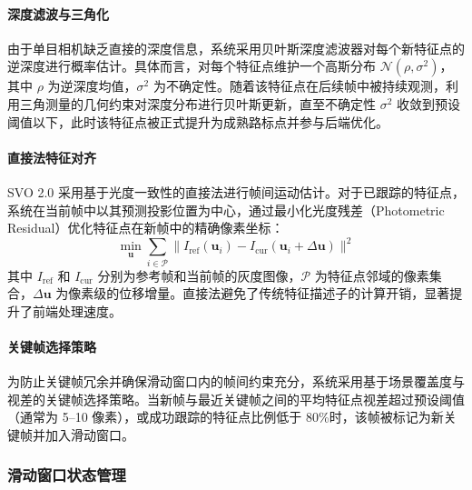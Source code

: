 \paragraph{深度滤波与三角化}
由于单目相机缺乏直接的深度信息，系统采用贝叶斯深度滤波器对每个新特征点的逆深度进行概率估计。具体而言，对每个特征点维护一个高斯分布 $\mathcal{N}(\rho, \sigma^2)$，其中 $\rho$ 为逆深度均值，$\sigma^2$ 为不确定性。随着该特征点在后续帧中被持续观测，利用三角测量的几何约束对深度分布进行贝叶斯更新，直至不确定性 $\sigma^2$ 收敛到预设阈值以下，此时该特征点被正式提升为成熟路标点并参与后端优化。

\paragraph{直接法特征对齐}
SVO 2.0 采用基于光度一致性的直接法进行帧间运动估计。对于已跟踪的特征点，系统在当前帧中以其预测投影位置为中心，通过最小化光度残差（Photometric Residual）优化特征点在新帧中的精确像素坐标：
\begin{equation}
    \min_{\mathbf{u}} \sum_{i \in \mathcal{P}} \| I_{\text{ref}}(\mathbf{u}_i) - I_{\text{cur}}(\mathbf{u}_i + \Delta \mathbf{u}) \|^2
\end{equation}
其中 $I_{\text{ref}}$ 和 $I_{\text{cur}}$ 分别为参考帧和当前帧的灰度图像，$\mathcal{P}$ 为特征点邻域的像素集合，$\Delta \mathbf{u}$ 为像素级的位移增量。直接法避免了传统特征描述子的计算开销，显著提升了前端处理速度。

\paragraph{关键帧选择策略}
为防止关键帧冗余并确保滑动窗口内的帧间约束充分，系统采用基于场景覆盖度与视差的关键帧选择策略。当新帧与最近关键帧之间的平均特征点视差超过预设阈值（通常为 5--10 像素），或成功跟踪的特征点比例低于 80\%时，该帧被标记为新关键帧并加入滑动窗口。

\subsubsection{滑动窗口状态管理}


